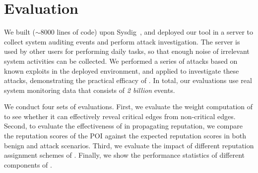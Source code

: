 \section{Evaluation}


We built \tool ($\sim$8000 lines of code) upon Sysdig~\cite{sysdig}, and deployed our tool in a server to collect system auditing events and perform attack investigation. 
The server is used by other users for performing daily tasks, so that enough noise of irrelevant system activities can be collected.
We performed a series of attacks based on known exploits in the deployed environment,
and applied \tool to
investigate these attacks, demonstrating the %
practical efficacy of \tool.
In total, our evaluations use
real
system monitoring data that consists of \emph{2 billion} events. 

We conduct four sets of evaluations.
First, we evaluate the weight computation of \tool to see whether it can effectively reveal critical edges from non-critical edges.
Second, to evaluate the effectiveness of \tool in propagating reputation,
we compare the reputation scores of the POI against the expected reputation scores in both benign and attack scenarios.
Third, we evaluate the impact of different reputation assignment schemes of \tool.
Finally, we show the performance statistics of different components of \tool.






